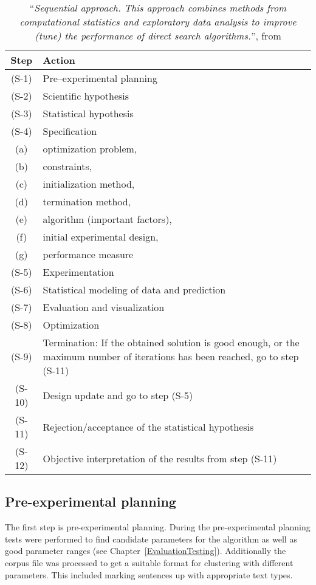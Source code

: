 \begin{table}[htdp]
\footnotesize
\caption{``\textit{Sequential approach. This approach combines methods from computational statistics and exploratory data analysis to improve (tune) the performance of direct search algorithms.}'', from \protect \cite[p. 417]{Bartz-Beielstein2004}}
\label{tab:experimentsequence}
\begin{center}
\begin{tabular}{|c|p{10cm}|}
\hline
Step & Action\\
\hline
(S-1) & Pre–experimental planning\\
(S-2) & Scientific hypothesis\\
(S-3) & Statistical hypothesis\\
(S-4) & Specification\\
(a) & optimization problem,\\
(b) & constraints,\\
(c) & initialization method,\\
(d) & termination method,\\
(e) & algorithm (important factors),\\ 
(f) & initial experimental design,\\ 
(g) & performance measure\\
(S-5) & Experimentation\\
(S-6) & Statistical modeling of data and prediction\\
(S-7) & Evaluation and visualization\\
(S-8) & Optimization\\
(S-9) & Termination: If the obtained solution is good enough, or the maximum number of iterations has
been reached, go to step (S-11)\\
(S-10) & Design update and go to step (S-5)\\
(S-11) & Rejection/acceptance of the statistical hypothesis\\
(S-12) & Objective interpretation of the results from step (S-11)\\
\hline
\end{tabular}
\end{center}
\end{table}

\subsection{Pre-experimental planning}
The first step is pre-experimental planning. During the pre-experimental planning tests were performed to find candidate parameters for the algorithm as well as good parameter ranges (see Chapter~\ref{EvaluationTesting}). Additionally the corpus file was processed to get a suitable format for clustering with different parameters. This included marking sentences up with appropriate text types.

